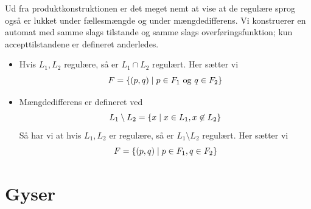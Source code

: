 \documentclass[a4paper,10pt,article]{memoir}
\begin{document}
Ud fra produktkonstruktionen er det meget nemt at vise at de regulære
sprog også er lukket under fællesmængde og under mængdedifferens. Vi
konstruerer en automat med samme slags tilstande og samme slags
overføringsfunktion; kun accepttilstandene er defineret anderledes.

\begin{itemize}
	\item Hvis $L_1, L_2$ regulære, så er $L_1 \cap L_2 $
          regulært. Her sætter vi
	\[ F = \{ (p,q) \mid p \in F_1 \text{ og } q \in F_2 \} \]
	\item Mængdedifferens er defineret ved \[ L_1 \setminus L_2 =
          \{ x \mid  x \in L_1, x \not \in L_2 \} \]
	Så har vi at hvis $L_1, L_2$ er regulære, så er $L_1 \setminus
        L_2$ regulært. Her sætter vi
	\[ F = \{ (p,q) \mid p \in F_1, q \in F_2  \} \]
\end{itemize}

\chapter{Gyser}
\end{document}
